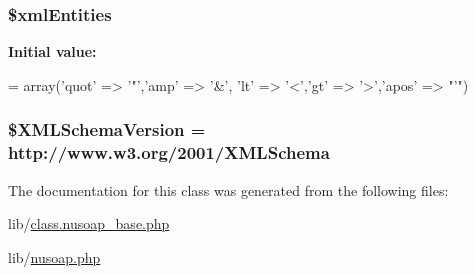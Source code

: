 \subsubsection[{\$xml\+Entities}]{\setlength{\rightskip}{0pt plus 5cm}\$xml\+Entities}\label{classnusoap__base_a912a5d3348012e245bb16e2cab11d4cc}
{\bfseries Initial value\+:}
\begin{DoxyCode}
= array(\textcolor{stringliteral}{'quot'} => \textcolor{charliteral}{'"'},\textcolor{stringliteral}{'amp'} => \textcolor{charliteral}{'&'},
        \textcolor{stringliteral}{'lt'} => \textcolor{charliteral}{'<'},\textcolor{stringliteral}{'gt'} => \textcolor{charliteral}{'>'},\textcolor{stringliteral}{'apos'} => \textcolor{stringliteral}{"'"})
\end{DoxyCode}
\hypertarget{classnusoap__base_a170fda624f458ce4f4b29e496ebfce4c}{}
\subsubsection[{\$\+X\+M\+L\+Schema\+Version}]{\setlength{\rightskip}{0pt plus 5cm}\$X\+M\+L\+Schema\+Version = \textquotesingle{}http\+://www.\+w3.\+org/2001/{\bf X\+M\+L\+Schema}\textquotesingle{}}\label{classnusoap__base_a170fda624f458ce4f4b29e496ebfce4c}


The documentation for this class was generated from the following files\+:\begin{DoxyCompactItemize}
\item 
lib/\hyperlink{class_8nusoap__base_8php}{class.\+nusoap\+\_\+base.\+php}\item 
lib/\hyperlink{nusoap_8php}{nusoap.\+php}\end{DoxyCompactItemize}
